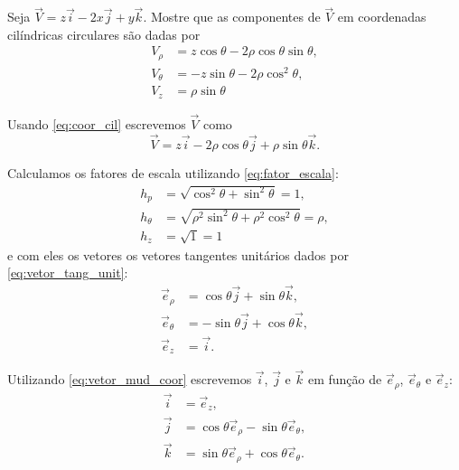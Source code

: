 \documentclass[a4paper,12pt, leqno, answers]{exam}
\begin{document}
\begin{questions}
    \question Seja $\vec{V} = z\vec{i} - 2x\vec{j} + y \vec{k}$. Mostre que as componentes de $\vec{V}$ em coordenadas cil\'{i}ndricas circulares s\~{a}o dadas por
    \begin{align*}
        V_\rho &= z \cos \theta - 2 \rho \cos \theta \sin \theta, \\
        V_\theta &= -z \sin \theta - 2 \rho \cos^2 \theta, \\
        V_z &= \rho \sin \theta
    \end{align*}
    \begin{solution}
        Usando \eqref{eq:coor_cil} escrevemos $\vec{V}$ como
        \[
        \vec{V} = z\vec{i} - 2 \rho \cos \theta \vec{j} + \rho \sin \theta \vec{k}.
        \]
  
        Calculamos os fatores de escala utilizando \eqref{eq:fator_escala}:
        \begin{align*}
            h_p &= \sqrt{\cos^2 \theta + \sin^2 \theta} = 1, \\
            h_\theta &= \sqrt{\rho^2 \sin^2 \theta + \rho^2 \cos^2 \theta} = \rho, \\
            h_z &= \sqrt{1} = 1
        \end{align*}
        e com eles os vetores os vetores tangentes unit\'{a}rios dados por \eqref{eq:vetor_tang_unit}:
        \begin{align*}
            \vec{e}_\rho &= \cos \theta \vec{j} + \sin \theta \vec{k}, \\
            \vec{e}_\theta &= - \sin \theta \vec{j} + \cos \theta \vec{k}, \\
            \vec{e}_z &= \vec{i}.
        \end{align*}
  
        Utilizando \eqref{eq:vetor_mud_coor} escrevemos $\vec{i}$, $\vec{j}$ e $\vec{k}$ em fun\c{c}\~{a}o de $\vec{e}_\rho$, $\vec{e}_\theta$ e $\vec{e}_z$:
        \begin{align*}
            \vec{i} &= \vec{e}_z, \\
            \vec{j} &= \cos \theta \vec{e}_\rho - \sin \theta \vec{e}_\theta, \\
            \vec{k} &= \sin \theta \vec{e}_\rho + \cos \theta \vec{e}_\theta.
        \end{align*}
  

\end{solution}
\end{questions}
\end{document}
